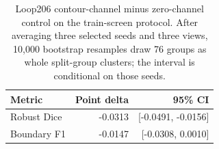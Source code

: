 
\begin{table}[t]
\centering
\caption{Loop206 contour-channel minus zero-channel control on the train-screen protocol. After averaging three selected seeds and three views, 10,000 bootstrap resamples draw 76 groups as whole split-group clusters; the interval is conditional on those seeds.}
\label{tab:loop206-ablation}
\begin{tabular}{lrr}
\toprule
Metric & Point delta & 95\% CI \\
\midrule
Robust Dice & -0.0313 & [-0.0491, -0.0156] \\
Boundary F1 & -0.0147 & [-0.0308, 0.0010] \\
\bottomrule
\end{tabular}
\end{table}
